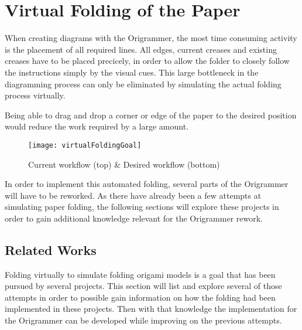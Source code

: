 
\section{Virtual Folding of the Paper}
\label{sec:virtualFolding}

When creating diagrams with the Origrammer, the most time consuming activity is the placement of all required lines. All edges, current creases and existing creases have to be placed precicely, in order to allow the folder to closely follow the instructions simply by the visual cues. This large bottleneck in the diagramming process can only be eliminated by simulating the actual folding process virtually.

Being able to drag and drop a corner or edge of the paper to the desired position would reduce the work required by a large amount.

 \begin{figure}[htbp]
	\centering
	\texttt{[image: virtualFoldingGoal]}
	\caption{Current workflow (top) \& Desired workflow (bottom)}
	\label{fig:virtualFoldingGoal}
\end{figure}

\noindent In order to implement this automated folding, several parts of the Origrammer will have to be reworked. As there have already been a few attempts at simulating paper folding, the following sections will explore these projects in order to gain additional knowledge relevant for the Origrammer rework.


\subsection{Related Works}
Folding virtually to simulate folding origami models is a goal that has been pursued by several projects. This section will list and explore several of those attempts in order to possible gain information on how the folding had been implemented in these projects. Then with that knowledge the implementation for the Origrammer can be developed while improving on the previous attempts.


